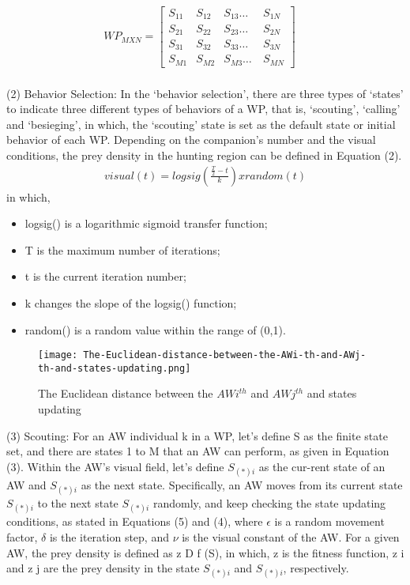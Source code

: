 \documentclass[conference]{IEEEtran}
\begin{document}
\begin{align}
WP_{MXN} = \begin{bmatrix} 
S_{11} & S_{12} & S_{13} \ldots\ &S_{1N} \\
S_{21} & S_{22} & S_{23} \ldots\ &S_{2N}\\
S_{31} & S_{32} & S_{33} \ldots\ &S_{3N} \\
S_{M1} & S_{M2} & S_{M3} \ldots\ &S_{MN}
\end{bmatrix}
\quad
\end{align}\\
(2) Behavior Selection: In the ‘behavior selection’, there
are three types of ‘states’ to indicate three different types of
behaviors of a WP, that is, ‘scouting’, ‘calling’ and ‘besieging’, in which, the ‘scouting’ state is set as the default state
or initial behavior of each WP.
Depending on the companion’s number and the visual conditions, the prey density in the hunting region can be defined
in Equation (2).\\

\begin{align} 
visual(t) = logsig\left(\frac{\frac{T}{2}- t}{k}\right) x random(t)
\end{align}
in which, 

\begin{itemize}
    \item logsig() is a logarithmic sigmoid transfer function;
    \item T is the maximum number of iterations;
    \item t is the current iteration number;
    \item k changes the slope of the logsig() function;
    \item random() is a random value within the range of (0,1).
\end{itemize}

\begin{figure}[H]
\centering
\begin{minipage}{0.4\textwidth}
    \texttt{[image: The-Euclidean-distance-between-the-AWi-th-and-AWj-th-and-states-updating.png]}
    \caption{The Euclidean distance between the $AWi^{th}$ and $AWj^{th}$ and states updating}
\end{minipage}
\end{figure}

(3) Scouting: For an AW individual k in a WP, let's define
S as the finite state set, and there are states 1 to M that an AW
can perform, as given in Equation (3).
Within the AW's visual field, let's define $S_{(*)i}$ as the cur-rent state of an AW and $S_{(*)i}$ as the next state. Specifically,
an AW moves from its current state $S_{(*)i}$ to the next state $S_{(*)i}$
randomly, and keep checking the state updating conditions,
as stated in Equations (5) and (4), where $\epsilon$ is a random
movement factor, $\delta$ is the iteration step, and $\nu$ is the visual
constant of the AW. For a given AW, the prey density is
defined as z D f (S), in which, z is the fitness function,
z i and z j are the prey density in the state $S_{(*)i}$ and $S_{(*)i}$,
respectively.
\end{document}
